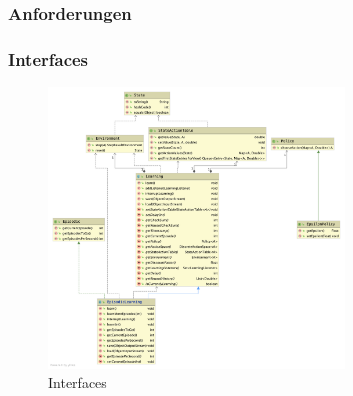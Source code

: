 \subsubsection{Anforderungen}

\subsubsection{Interfaces}
\begin{figure}[H]
    \centering
    \includegraphics[width=0.7\textwidth]{images/Interfaces.png}
    \caption{Interfaces}
    \label{fig:GPI}
\end{figure}